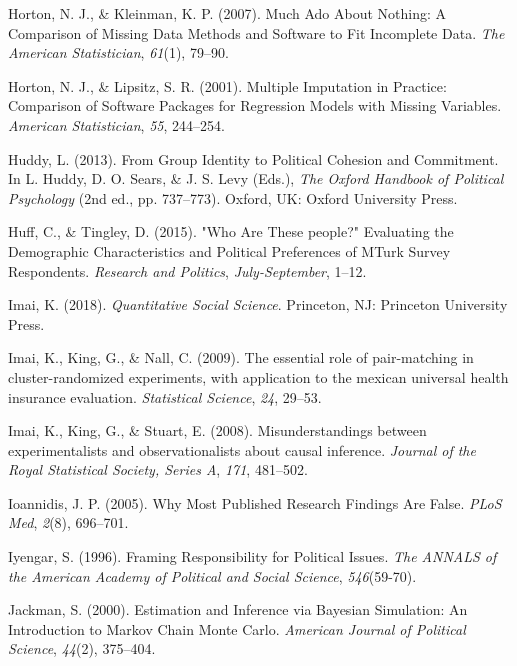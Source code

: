 \documentclass[12pt,econ]{sources/authesis}
\begin{document}
\leavevmode\hypertarget{ref-horton_2007_much}{}%
Horton, N. J., \& Kleinman, K. P. (2007). Much Ado About Nothing: A Comparison of Missing Data Methods and Software to Fit Incomplete Data. \emph{The American Statistician}, \emph{61}(1), 79--90.

\leavevmode\hypertarget{ref-horton_2001_multiple}{}%
Horton, N. J., \& Lipsitz, S. R. (2001). Multiple Imputation in Practice: Comparison of Software Packages for Regression Models with Missing Variables. \emph{American Statistician}, \emph{55}, 244--254.

\leavevmode\hypertarget{ref-huddy_2013_from}{}%
Huddy, L. (2013). From Group Identity to Political Cohesion and Commitment. In L. Huddy, D. O. Sears, \& J. S. Levy (Eds.), \emph{The Oxford Handbook of Political Psychology} (2nd ed., pp. 737--773). Oxford, UK: Oxford University Press.

\leavevmode\hypertarget{ref-huff_who_2015}{}%
Huff, C., \& Tingley, D. (2015). "Who Are These people?" Evaluating the Demographic Characteristics and Political Preferences of MTurk Survey Respondents. \emph{Research and Politics}, \emph{July-September}, 1--12.

\leavevmode\hypertarget{ref-imai_quantitative_2018}{}%
Imai, K. (2018). \emph{Quantitative Social Science}. Princeton, NJ: Princeton University Press.

\leavevmode\hypertarget{ref-imai_2009_essential}{}%
Imai, K., King, G., \& Nall, C. (2009). The essential role of pair-matching in cluster-randomized experiments, with application to the mexican universal health insurance evaluation. \emph{Statistical Science}, \emph{24}, 29--53.

\leavevmode\hypertarget{ref-imai_2008_misunderstandings}{}%
Imai, K., King, G., \& Stuart, E. (2008). Misunderstandings between experimentalists and observationalists about causal inference. \emph{Journal of the Royal Statistical Society, Series A}, \emph{171}, 481--502.

\leavevmode\hypertarget{ref-ioannidis_2005_most}{}%
Ioannidis, J. P. (2005). Why Most Published Research Findings Are False. \emph{PLoS Med}, \emph{2}(8), 696--701.

\leavevmode\hypertarget{ref-iyengar_framing_1996}{}%
Iyengar, S. (1996). Framing Responsibility for Political Issues. \emph{The ANNALS of the American Academy of Political and Social Science}, \emph{546}(59-70).

\leavevmode\hypertarget{ref-jackman_2000_estimation}{}%
Jackman, S. (2000). Estimation and Inference via Bayesian Simulation: An Introduction to Markov Chain Monte Carlo. \emph{American Journal of Political Science}, \emph{44}(2), 375--404.
\end{document}
